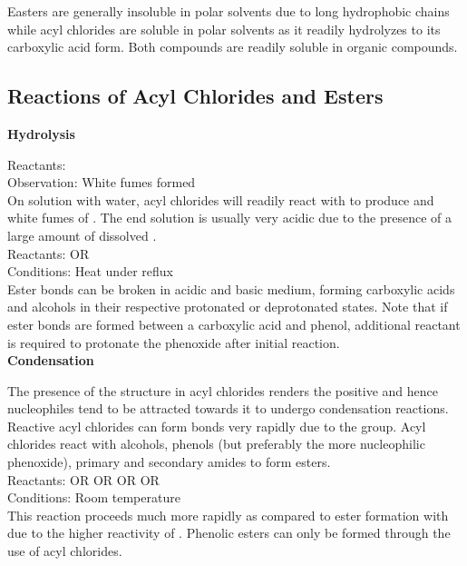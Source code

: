 \documentclass[../main]{subfiles}
\begin{document}
	Easters are generally insoluble in polar solvents due to long hydrophobic chains while acyl chlorides are soluble in polar solvents as it readily hydrolyzes to its carboxylic acid form. Both compounds are readily soluble in organic compounds.

	\subsection{Reactions of Acyl Chlorides and Esters}

	\noindent \textbf{Hydrolysis}

	Reactants:  \\
	Observation: White fumes formed  \\

	On solution with water, acyl chlorides will readily react with  to produce  and white fumes of . The end solution is usually very acidic due to the presence of a large amount of dissolved . \\

	Reactants:  OR  \\
	Conditions: Heat under reflux \\

	Ester bonds can be broken in acidic and basic medium, forming carboxylic acids and alcohols in their respective protonated or deprotonated states. Note that if ester bonds are formed between a carboxylic acid and phenol, additional reactant is required to protonate the phenoxide after initial reaction. \\

	\noindent \textbf{Condensation}

	The presence of the  structure in acyl chlorides renders the  positive and hence nucleophiles tend to be attracted towards it to undergo condensation reactions. \\

	Reactive acyl chlorides can form  bonds very rapidly due to the  group. Acyl chlorides react with alcohols, phenols (but preferably the more nucleophilic phenoxide), primary and secondary amides to form esters. \\

	Reactants:  OR  OR  OR  OR  \\
	Conditions: Room temperature \\

	This reaction proceeds much more rapidly as compared to ester formation with  due to the higher reactivity of . Phenolic esters can only be formed through the use of acyl chlorides.
	
\end{document}
